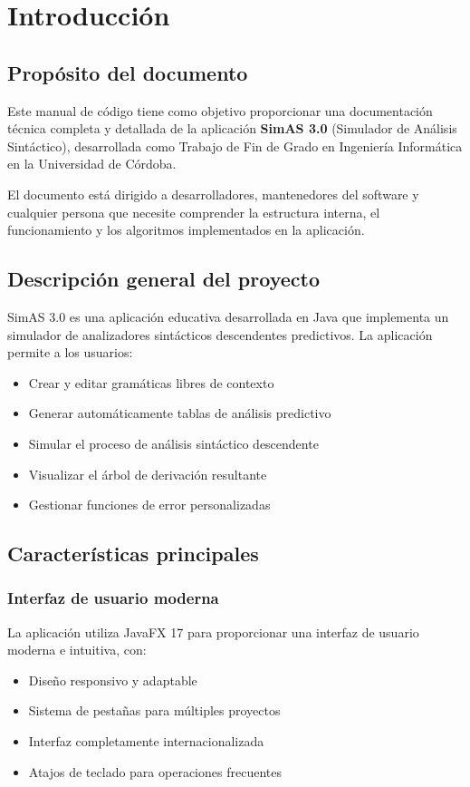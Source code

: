 \chapter{Introducción}\label{cap-introduccion}

\section{Propósito del documento}

Este manual de código tiene como objetivo proporcionar una documentación técnica completa y detallada de la aplicación \textbf{SimAS 3.0} (Simulador de Análisis Sintáctico), desarrollada como Trabajo de Fin de Grado en Ingeniería Informática en la Universidad de Córdoba.

El documento está dirigido a desarrolladores, mantenedores del software y cualquier persona que necesite comprender la estructura interna, el funcionamiento y los algoritmos implementados en la aplicación.

\section{Descripción general del proyecto}

SimAS 3.0 es una aplicación educativa desarrollada en Java que implementa un simulador de analizadores sintácticos descendentes predictivos. La aplicación permite a los usuarios:

\begin{itemize}
    \item Crear y editar gramáticas libres de contexto
    \item Generar automáticamente tablas de análisis predictivo
    \item Simular el proceso de análisis sintáctico descendente
    \item Visualizar el árbol de derivación resultante
    \item Gestionar funciones de error personalizadas
\end{itemize}

\section{Características principales}

\subsection{Interfaz de usuario moderna}
La aplicación utiliza JavaFX 17 para proporcionar una interfaz de usuario moderna e intuitiva, con:
\begin{itemize}
    \item Diseño responsivo y adaptable
    \item Sistema de pestañas para múltiples proyectos
    \item Interfaz completamente internacionalizada
    \item Atajos de teclado para operaciones frecuentes
\end{itemize}

